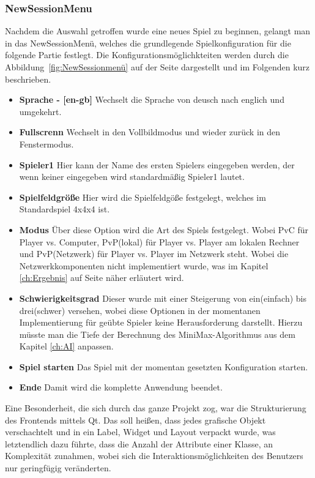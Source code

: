 \documentclass[a4paper]{scrartcl}
\begin{document}
\subsubsection{NewSessionMenu}\label{ch:NewSessionMenu}
Nachdem die Auswahl getroffen wurde eine neues Spiel zu beginnen, gelangt man in das NewSessionMenü, welches die grundlegende Spielkonfiguration für die folgende Partie festlegt. Die Konfigurationsmöglichkteiten werden durch die Abbildung~\ref{fig:NewSessionmenü} auf der Seite \pageref{fig:NewSessionmenü} dargestellt und im Folgenden kurz beschrieben. 

\begin{itemize}
	\item \textbf{Sprache - [en-gb]} Wechselt die Sprache von deusch nach englich und umgekehrt.
	\item \textbf{Fullscrenn} Wechselt in den Vollbildmodus und wieder zurück in den Fenstermodus.
	\item \textbf{Spieler1} Hier kann der Name des ersten Spielers eingegeben werden, der wenn keiner eingegeben wird standardmäßig Spieler1 lautet.
	\item \textbf{Spielfeldgröße} Hier wird die Spielfeldgöße festgelegt, welches im Standardspiel 4x4x4 ist.
	\item \textbf{Modus} Über diese Option wird die Art des Spiels festgelegt. Wobei PvC für Player vs. Computer, PvP(lokal) für Player vs. Player am lokalen Rechner und PvP(Netzwerk) für Player vs. Player im Netzwerk steht. Wobei die Netzwerkkomponenten nicht implementiert wurde, was im Kapitel \ref{ch:Ergebnis} auf Seite \pageref{ch:Ergebnis} näher erläutert wird.
	\item \textbf{\glqq Schwierigkeitsgrad\grqq} Dieser wurde mit einer Steigerung von ein(einfach) bis drei(schwer) versehen, wobei diese Optionen in der momentanen Implementierung für geübte Spieler keine Herausforderung darstellt. Hierzu müsste man die Tiefe der Berechnung des MiniMax-Algorithmus aus dem Kapitel \ref{ch:AI} anpassen.
	\item \textbf{Spiel starten} Das Spiel mit der momentan gesetzten Konfiguration starten.
	\item \textbf{Ende} Damit wird die komplette Anwendung beendet.
\end{itemize}

Eine Besonderheit, die sich durch das ganze Projekt zog, war die Strukturierung des Frontends mittels Qt. Das soll heißen, dass jedes grafische Objekt verschachtelt und in ein Label, Widget und Layout verpackt wurde, was letztendlich dazu führte, dass die Anzahl der Attribute einer Klasse, an Komplexität zunahmen, wobei sich die Interaktionsmöglichkeiten des Benutzers nur geringfügig veränderten.
 
\end{document}
